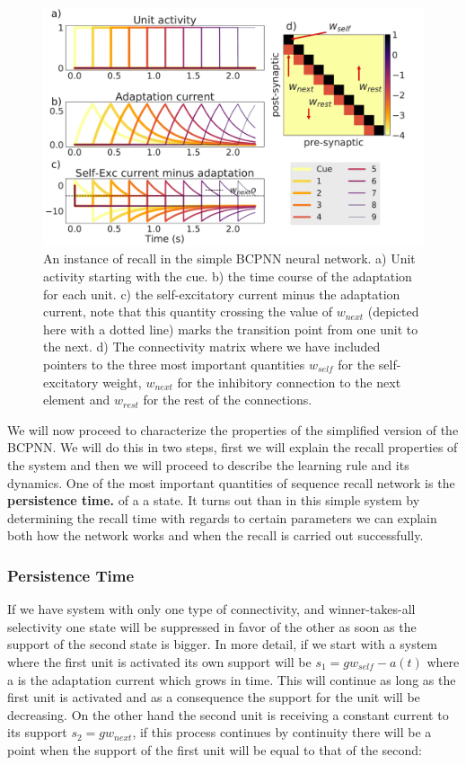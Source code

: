 \documentclass[10pt,a4paper]{article}
\begin{document}
\begin{figure}[H]
\centering
\includegraphics[scale=0.26]{simple_bcpnn_recall.pdf}
\caption{An instance of recall in the simple BCPNN neural network. a) Unit activity starting with the cue. b) the time course of the adaptation for each unit. c) the self-excitatory current minus the adaptation current, note that this quantity crossing the value of $w_{next}$ (depicted here with a dotted line) marks the transition point from one unit to the next. d) The connectivity matrix where we have included pointers to the three most important quantities $w_{self}$ for the self-excitatory weight, $w_{next}$ for the inhibitory connection to the next element and $w_{rest}$ for the rest of the connections.}
\label{fig:bcpnn_simple_recall}
\end{figure}


We will now proceed to characterize the properties of the simplified version of the BCPNN. We will do this in two steps, first we will explain the recall properties of the system and then we will proceed to describe the learning rule and its dynamics. One of the most important quantities of sequence recall network is the \textbf{persistence time.} of a a state. It turns out than in this simple system by determining the recall time with regards to certain parameters we can explain both how the network works and when the recall is carried out successfully.


\subsubsection{Persistence Time}
If we have system with only one type of connectivity, and winner-takes-all selectivity one state will be suppressed in favor of the other as soon as the support of the second state is bigger. In more detail, if we start with a system where the first unit is activated its own support will be $s_1 = g w_{self} - a(t)$ where a is the adaptation current which grows in time. This will continue as long as the first unit is activated and as a consequence the support for the unit will be decreasing. On the other hand the second unit is receiving a constant current to its support $s_2 = g w_{next}$, if this process continues by continuity there will be a point when the support of the first unit will be equal to that of the second:
\end{document}

